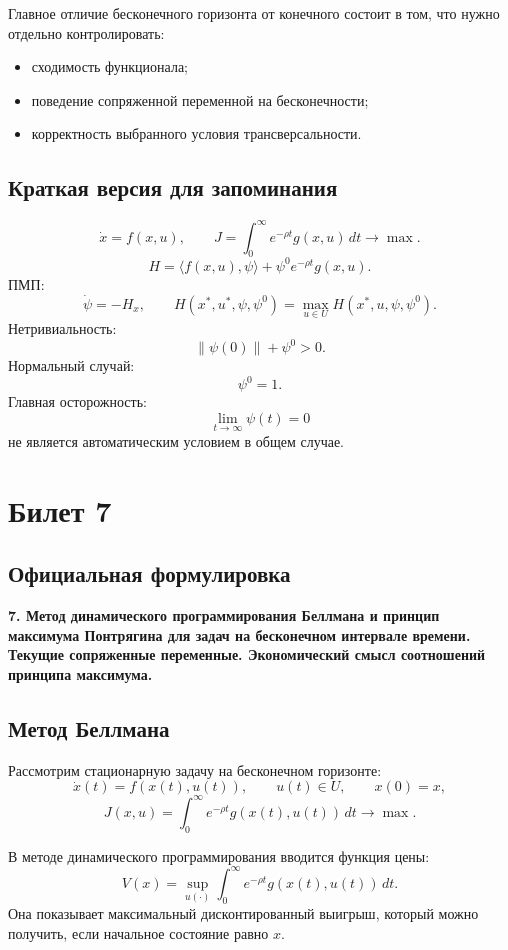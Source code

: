 \documentclass[12pt,a4paper]{article}
\begin{document}
Главное отличие бесконечного горизонта от конечного состоит в том, что нужно отдельно контролировать:
\begin{itemize}
    \item сходимость функционала;
    \item поведение сопряженной переменной на бесконечности;
    \item корректность выбранного условия трансверсальности.
\end{itemize}

\subsection{Краткая версия для запоминания}

\[
    \dot x=f(x,u),
    \qquad
    J=\int_0^\infty e^{-\rho t}g(x,u)\,dt\to\max.
\]
\[
    H=\langle f(x,u),\psi\rangle+\psi^0e^{-\rho t}g(x,u).
\]
ПМП:
\[
    \dot\psi=-H_x,
    \qquad
    H(x^*,u^*,\psi,\psi^0)=\max_{u\in U}H(x^*,u,\psi,\psi^0).
\]
Нетривиальность:
\[
    \|\psi(0)\|+\psi^0>0.
\]
Нормальный случай:
\[
    \psi^0=1.
\]
Главная осторожность:
\[
    \lim_{t\to\infty}\psi(t)=0
\]
не является автоматическим условием в общем случае.

\newpage

\section{Билет 7}

\subsection*{Официальная формулировка}

\textbf{7. Метод динамического программирования Беллмана и принцип максимума Понтрягина для задач на бесконечном интервале времени. Текущие сопряженные переменные. Экономический смысл соотношений принципа максимума.}

\subsection{Метод Беллмана}

Рассмотрим стационарную задачу на бесконечном горизонте:
\[
    \dot x(t)=f(x(t),u(t)),
    \qquad
    u(t)\in U,
    \qquad
    x(0)=x,
\]
\[
    J(x,u)=\int_0^\infty e^{-\rho t}g(x(t),u(t))\,dt\to\max.
\]

В методе динамического программирования вводится функция цены:
\[
    V(x)=\sup_{u(\cdot)}\int_0^\infty e^{-\rho t}g(x(t),u(t))\,dt.
\]
Она показывает максимальный дисконтированный выигрыш, который можно получить, если начальное состояние равно \(x\).
\end{document}
